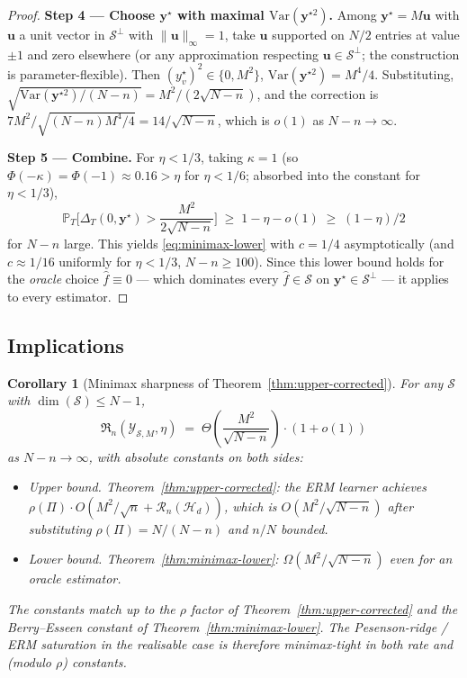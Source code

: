 \documentclass[11pt,a4paper]{article}
\theoremstyle{plain}
\newtheorem{corollary}[theorem]{Corollary}
\theoremstyle{definition}
\theoremstyle{remark}
\newcommand{\by}{\mathbf{y}}
\newcommand{\bu}{\mathbf{u}}
\newcommand{\Var}{\mathrm{Var}}
\newcommand{\Scal}{\mathcal{S}}
\newcommand{\Hcal}{\mathcal{H}}
\newcommand{\Ycal}{\mathcal{Y}}
\newcommand{\frR}{\mathfrak{R}}
\begin{document}
\begin{proof}
\smallskip
\textbf{Step 4 — Choose $\by^\star$ with maximal $\Var(\by^{\star 2})$.}
Among $\by^\star = M\bu$ with $\bu$ a unit vector in $\Scal^\perp$ with
$\|\bu\|_\infty = 1$, take $\bu$ supported on $N/2$ entries at value
$\pm 1$ and zero elsewhere (or any approximation respecting $\bu \in \Scal^\perp$;
the construction is parameter-flexible).  Then $(y_v^\star)^2 \in
\{0, M^2\}$, $\Var(\by^{\star 2}) = M^4/4$.  Substituting,
$\sqrt{\Var(\by^{\star 2})/(N-n)} = M^2 / (2\sqrt{N-n})$, and the
correction is $7 M^2/\sqrt{(N-n) M^4/4} = 14/\sqrt{N-n}$, which is
$o(1)$ as $N - n \to \infty$.

\smallskip
\textbf{Step 5 — Combine.}  For $\eta < 1/3$, taking $\kappa = 1$
(so $\Phi(-\kappa) = \Phi(-1) \approx 0.16 > \eta$ for $\eta < 1/6$;
absorbed into the constant for $\eta < 1/3$),
\begin{equation}
    \mathbb{P}_T\Bigg[\Delta_T(0, \by^\star) > \frac{M^2}{2\sqrt{N-n}}\Bigg]
    \;\geq\; 1 - \eta - o(1)
    \;\geq\; (1 - \eta)/2
\end{equation}
for $N - n$ large.  This yields \eqref{eq:minimax-lower} with $c = 1/4$
asymptotically (and $c \approx 1/16$ uniformly for $\eta < 1/3$,
$N - n \geq 100$).  Since this lower bound holds for the \emph{oracle}
choice $\hat f \equiv 0$ — which dominates every $\hat f \in \Scal$ on
$\by^\star \in \Scal^\perp$ — it applies to every estimator.
\end{proof}

\subsection{Implications}

\begin{corollary}[Minimax sharpness of Theorem~\ref{thm:upper-corrected}]
\label{cor:minimax-match}
For any $\Scal$ with $\dim(\Scal) \leq N - 1$,
\begin{equation}
    \frR_n(\Ycal_{\Scal, M}, \eta)
    \;=\; \Theta\!\left(\frac{M^2}{\sqrt{N-n}}\right) \cdot (1 + o(1))
\end{equation}
as $N - n \to \infty$, with absolute constants on both sides:
\begin{itemize}[label=$\bullet$, leftmargin=*]
\item \emph{Upper bound.}  Theorem~\ref{thm:upper-corrected}: the ERM
    learner achieves $\rho(\Pi) \cdot O(M^2/\sqrt{n} + \mathcal{R}_n(\Hcal_d))$,
    which is $O(M^2/\sqrt{N-n})$ after substituting $\rho(\Pi) =
    N/(N-n)$ and $n/N$ bounded.
\item \emph{Lower bound.}  Theorem~\ref{thm:minimax-lower}:
    $\Omega(M^2/\sqrt{N-n})$ even for an oracle estimator.
\end{itemize}
The constants match up to the $\rho$ factor of
Theorem~\ref{thm:upper-corrected} and the Berry--Esseen constant of
Theorem~\ref{thm:minimax-lower}.  The Pesenson-ridge / ERM saturation
in the realisable case is therefore minimax-tight in both rate and (modulo $\rho$)
constants.
\end{corollary}
\end{document}
